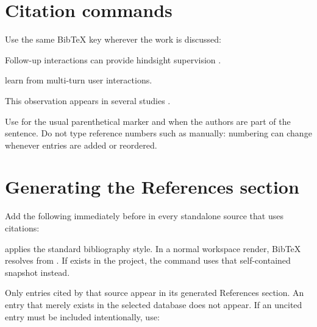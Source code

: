 \section*{Citation commands}

Use the same BibTeX key wherever the work is discussed:

\begin{DocCode}
Follow-up interactions can provide hindsight supervision
\citep{kleinebuening2026aligning}.

\citet{kleinebuening2026aligning} learn from multi-turn
user interactions.

This observation appears in several studies
\citep{firstKey,secondKey,thirdKey}.
\end{DocCode}

Use \code{\citep} for the usual parenthetical marker and \code{\citet} when the authors are part of the sentence.
Do not type reference numbers such as \code{[1]} manually: numbering can change whenever entries are added or reordered.

\section*{Generating the References section}

Add the following immediately before \code{} in every standalone source that uses citations:

\begin{DocCode}
\manualBibliography


\end{DocCode}

\code{\manualBibliography} applies the standard  bibliography style.
In a normal workspace render, BibTeX resolves  from .
If  exists in the project, the command uses that self-contained snapshot instead.

Only entries cited by that source appear in its generated References section.
An entry that merely exists in the selected database does not appear.
If an uncited entry must be included intentionally, use:

\begin{DocCode}
\nocite{citationKey}
\end{DocCode}

